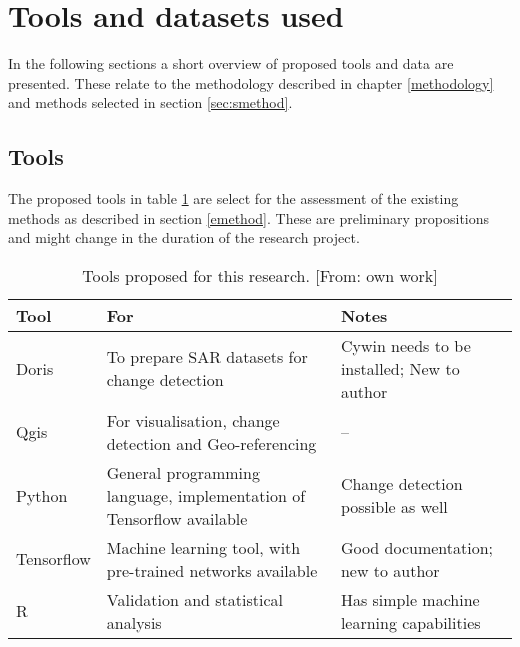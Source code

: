 \section{Tools and datasets used} \label{tool}
In the following sections a short overview of proposed tools and data are presented. These relate to the methodology described in chapter \ref{methodology} and methods selected in section \ref{sec:smethod}.

\subsection{Tools}
The proposed tools in table \ref{tab:tools} are select for the assessment of the existing methods as described in section \ref{emethod}. These are preliminary propositions and might change in the duration of the research project.\\
\begin{table} [h]
	\centering
	\begin{footnotesize}
		\begin{tabular}{lp{5cm}p{4cm}}
			\toprule
			Tool & For & Notes \\
			\midrule
			Doris & To prepare SAR datasets for change detection & Cywin needs to be installed; New to author \\
			Qgis & For visualisation, change detection and Geo-referencing & -- \\
			Python & General programming language, implementation of Tensorflow available & Change detection possible as well \\
			Tensorflow & Machine learning tool, with pre-trained networks available & Good documentation; new to author \\
			R & Validation and statistical analysis & Has simple machine learning capabilities \\
			\bottomrule
		\end{tabular}
	\end{footnotesize}
	\caption{Tools proposed for this research. [From: own work]}
	\label{tab:tools}
\end{table}
